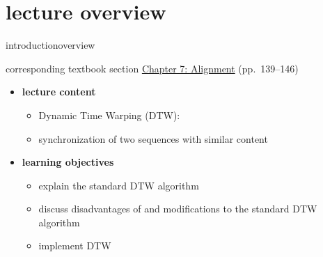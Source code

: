 




\subtitle{Module 7.0: Dynamic Time Warping}


	

    \section[overview]{lecture overview}
        \begin{frame}{introduction}{overview}
            \begin{block}{corresponding textbook section}
                    \href{http://ieeexplore.ieee.org/xpl/articleDetails.jsp?arnumber=6331122}{Chapter 7: Alignment} (pp.~139--146)
            \end{block}

            \begin{itemize}
                \item   \textbf{lecture content}
                    \begin{itemize}
                        \item   Dynamic Time Warping (DTW):
                        \item[] synchronization of two sequences with similar content
                    \end{itemize}
                \bigskip
                \item<2->   \textbf{learning objectives}
                    \begin{itemize}
                        \item   explain the standard DTW algorithm
                        \item   discuss disadvantages of and modifications to the standard DTW algorithm
                        \item   implement DTW
                    \end{itemize}
            \end{itemize}
        \end{frame}

